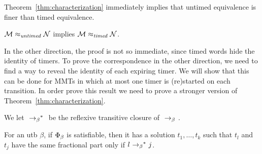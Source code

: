 Theorem~\ref{thm:characterization} immediately implies
that untimed equivalence is finer than timed equivalence.

\begin{theorem}
\label{untimedimpliestimed}
${\mathcal M} \approx_{\mathit{untimed}} {\mathcal N}$
implies
${\mathcal M} \approx_{\mathit{timed}} {\mathcal N}$.
\end{theorem}

In the other direction, the proof is not so immediate, since timed words
hide the identity of timers. To prove the correspondence in the other direction,
we need to find a way to reveal the identity of each expiring timer.
We will show that this can be done for MMTs in which at most one timer is
(re)started on each transition. 
In order prove this result we need to prove a stronger version of
Theorem~\ref{thm:characterization}.

We let $\ {\rightarrow_{\beta}}^*\ $ be the reflexive transitive closure of
$\ \rightarrow_{\beta} \ $.

\begin{lemma}
\label{lem:transparent}
  For an utb $\beta$, if $\Phi_{\beta}$ is satisfiable, then
  it has a solution $t_1, \ldots , t_k$ such that
  $t_l$ and $t_j$ have the same fractional part only if
  $l \ {\rightarrow_{\beta}}^*\  j$.
\end{lemma}

